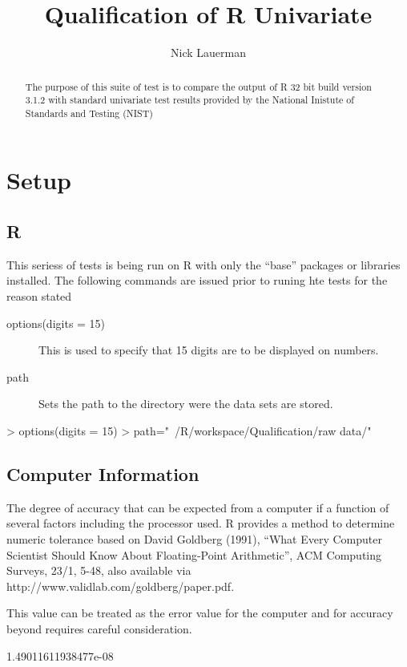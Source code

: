 \documentclass[10pt]{article}
\title{Qualification of R Univariate}
\author{Nick Lauerman}
\begin{document}

\maketitle

\begin{abstract}
The purpose of this suite of test is to compare the output of R 32 bit build
version 3.1.2 with standard univariate test results provided by the National
Inistute of Standards and Testing (NIST)
\end{abstract}

\tableofcontents

\section{Setup}
\subsection{R}
This seriess of tests is being run on R with only the ``base'' packages or libraries
installed. The following commands are issued prior to runing hte tests for the 
reason stated

\begin{description}
   \item[options(digits = 15)] This is used to specify that 15 digits are to be displayed
   on numbers.
   \item[path] Sets the path to the directory were the data sets are stored.
\end{description}
\begin{Schunk}
\begin{Sinput}
> options(digits = 15)
> path="~/R/workspace/Qualification/raw data/"
\end{Sinput}
\end{Schunk}
\subsection{Computer Information}

The degree of accuracy  that can be expected from a computer if a function of several
factors including the processor used. R provides a method to determine 
numeric tolerance based on David Goldberg (1991), 
``What Every Computer Scientist Should Know About Floating-Point Arithmetic'', 
ACM Computing Surveys, 23/1, 5-48, also available via 
http://www.validlab.com/goldberg/paper.pdf.

This value can be treated as the error value for the computer and for accuracy 
beyond requires careful consideration.
\begin{Schunk}
\begin{Soutput}
[1] 1.49011611938477e-08
\end{Soutput}
\end{Schunk}
\end{document}
